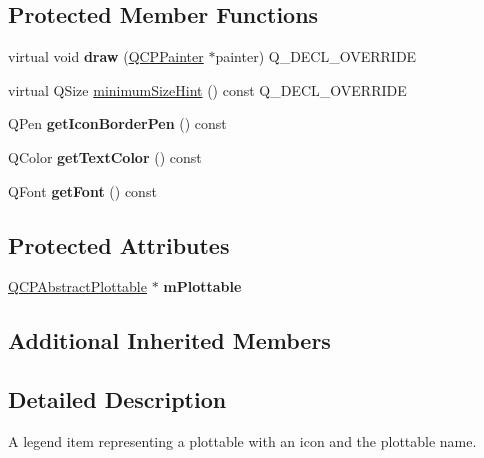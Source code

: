\subsection*{Protected Member Functions}
\begin{DoxyCompactItemize}
\item 
\mbox{\label{class_q_c_p_plottable_legend_item_a5838366619200e99680afa6d355d13fa}} 
virtual void {\bfseries draw} (\mbox{\hyperlink{class_q_c_p_painter}{Q\+C\+P\+Painter}} $\ast$painter) Q\+\_\+\+D\+E\+C\+L\+\_\+\+O\+V\+E\+R\+R\+I\+DE
\item 
virtual Q\+Size \mbox{\hyperlink{class_q_c_p_plottable_legend_item_a923b8b0e2b888cbb00abae0783edf509}{minimum\+Size\+Hint}} () const Q\+\_\+\+D\+E\+C\+L\+\_\+\+O\+V\+E\+R\+R\+I\+DE
\item 
\mbox{\label{class_q_c_p_plottable_legend_item_afa81a8bd4434ec249efbbfc2a030a752}} 
Q\+Pen {\bfseries get\+Icon\+Border\+Pen} () const
\item 
\mbox{\label{class_q_c_p_plottable_legend_item_a55daaffee35326765deebf8271efe210}} 
Q\+Color {\bfseries get\+Text\+Color} () const
\item 
\mbox{\label{class_q_c_p_plottable_legend_item_a77d980f594046226f9ac075fa07244b3}} 
Q\+Font {\bfseries get\+Font} () const
\end{DoxyCompactItemize}
\subsection*{Protected Attributes}
\begin{DoxyCompactItemize}
\item 
\mbox{\label{class_q_c_p_plottable_legend_item_ada647fb4b22971a1a424e15b4f6af0d9}} 
\mbox{\hyperlink{class_q_c_p_abstract_plottable}{Q\+C\+P\+Abstract\+Plottable}} $\ast$ {\bfseries m\+Plottable}
\end{DoxyCompactItemize}
\subsection*{Additional Inherited Members}


\subsection{Detailed Description}
A legend item representing a plottable with an icon and the plottable name. 


